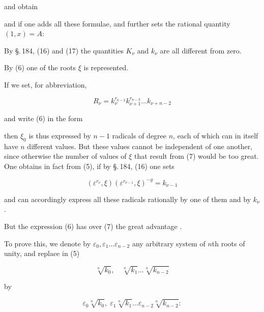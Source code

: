 
and obtain


and if one adds all these formulae, and further sets the rational quantity $(1, x) = A$:


By \S.\,184, (16) and (17) the quantities $K_\nu$ and $k_\nu$ are all different from zero.

By (6) one of the roots $\xi$ is represented.

If we set, for abbreviation,

\[
R_\nu = k_\nu^{r_{n-2}} k_{\nu+1}^{r_{n-3}} \ldots k_{\nu+n-2}
\]

and write (6) in the form


then $\xi_0$ is thus expressed by $n-1$ radicals of degree $n$, each of which can in itself have $n$ different values. But these values cannot be independent of one another, since otherwise the number of values of $\xi$ that result from (7) would be too great. One obtains in fact from (5), if by \S.\,184, (16) one sets

\[
(\varepsilon^{r_\nu}, \xi) (\varepsilon^{r_{\nu-1}}, \xi)^{-g} = k_{\nu-1}
\]


and can accordingly express all these radicals rationally by one of them and by $k_\nu$.

But the expression (6) has over (7) the great advantage .

To prove this, we denote by $\varepsilon_0, \varepsilon_1 \ldots \varepsilon_{n-2}$ any arbitrary system of $n$th roots of unity, and replace in (5)

\[
\sqrt[n]{k_0}, \quad \sqrt[n]{k_1} \ldots \sqrt[n]{k_{n-2}}
\]

by

\[
\varepsilon_0 \sqrt[n]{k_0}, \; \varepsilon_1 \sqrt[n]{k_1} \ldots \varepsilon_{n-2} \sqrt[n]{k_{n-2}}:
\]
